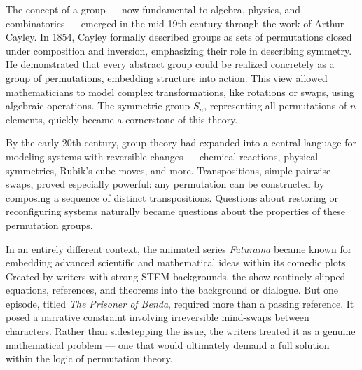 \begin{historical}
The concept of a group — now fundamental to algebra, physics, and combinatorics — emerged in the mid-19th century through the work of Arthur Cayley. In 1854, Cayley formally described groups as sets of permutations closed under composition and inversion, emphasizing their role in describing symmetry. He demonstrated that every abstract group could be realized concretely as a group of permutations, embedding structure into action. This view allowed mathematicians to model complex transformations, like rotations or swaps, using algebraic operations. The symmetric group \( S_n \), representing all permutations of \( n \) elements, quickly became a cornerstone of this theory.

By the early 20th century, group theory had expanded into a central language for modeling systems with reversible changes — chemical reactions, physical symmetries, Rubik’s cube moves, and more. Transpositions, simple pairwise swaps, proved especially powerful: any permutation can be constructed by composing a sequence of distinct transpositions. Questions about restoring or reconfiguring systems naturally became questions about the properties of these permutation groups.

In an entirely different context, the animated series \textit{Futurama} became known for embedding advanced scientific and mathematical ideas within its comedic plots. Created by writers with strong STEM backgrounds, the show routinely slipped equations, references, and theorems into the background or dialogue. But one episode, titled \textit{The Prisoner of Benda}, required more than a passing reference. It posed a narrative constraint involving irreversible mind-swaps between characters. Rather than sidestepping the issue, the writers treated it as a genuine mathematical problem — one that would ultimately demand a full solution within the logic of permutation theory.
\end{historical}
